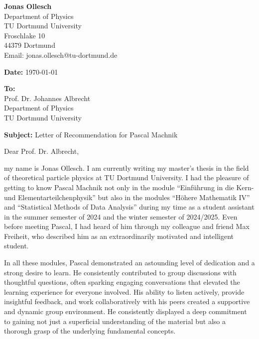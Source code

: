\documentclass[12pt]{article}
\begin{document}
\noindent
\begin{minipage}[t]{\textwidth}
\raggedleft
\textbf{Jonas Ollesch} \\
Department of Physics \\
TU Dortmund University \\
Froschlake 10 \\
44379 Dortmund \\
Email: jonas.ollesch@tu-dortmund.de \\
\end{minipage}

\vspace{1.5cm} %

\noindent
\textbf{Date:} \today

\vspace{0.5cm}

\noindent
\textbf{To:} \\
Prof. Dr. Johannes Albrecht \\
Department of Physics\\
TU Dortmund University \\

\vspace{1cm}

\noindent
\textbf{Subject:} Letter of Recommendation for Pascal Machnik

\vspace{1cm}

Dear Prof. Dr. Albrecht,

\vspace{.5cm}

my name is Jonas Ollesch. I am currently writing my master's thesis in the field of theoretical particle physics at TU Dortmund University.
I had the pleasure of getting to know Pascal Machnik not only in the module “Einführung in die Kern- und Elementarteilchenphysik”
but also in the modules “Höhere Mathematik IV” and “Statistical Methods of Data Analysis” during my time as a student assistant 
in the summer semester of 2024 and the winter semester of 2024/2025.
Even before meeting Pascal, I had heard of him through my colleague and friend Max Freiheit, who described him as an extraordinarily motivated and intelligent student.

In all these modules, Pascal demonstrated an astounding level of dedication and a strong desire to learn. 
He consistently contributed to group discussions with thoughtful questions, often sparking engaging conversations that elevated the learning experience for everyone involved. 
His ability to listen actively, provide insightful feedback, 
and work collaboratively with his peers created a supportive and dynamic group environment.
He consistently displayed a deep commitment to gaining not just a superficial understanding of the material but also a thorough grasp of the underlying fundamental concepts. 
\end{document}
